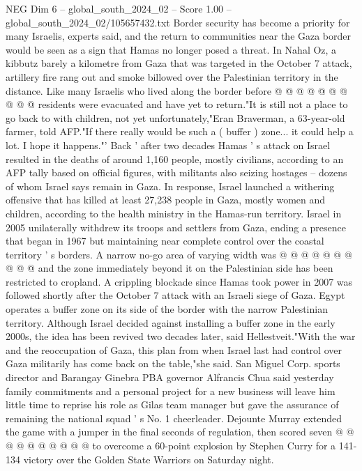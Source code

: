 \begin{textsample}{NEG Dim 6 – global\_south\_2024\_02 – Score 1.00 – global\_south\_2024\_02/105657432.txt}
Border security has become a priority for many Israelis, experts said, and the return to communities near the Gaza border would be seen as a sign that Hamas no longer posed a threat.
In Nahal Oz, a kibbutz barely a kilometre from Gaza that was targeted in the October 7 attack, artillery fire rang out and smoke billowed over the Palestinian territory in the distance.
Like many Israelis who lived along the border before @ @ @ @ @ @ @ @ @ @ residents were evacuated and have yet to return."It is still not a place to go back to with children, not yet unfortunately,"Eran Braverman, a 63-year-old farmer, told AFP."If there really would be such a ( buffer ) zone... it could help a lot.
I hope it happens."' Back ' after two decades Hamas ' s attack on Israel resulted in the deaths of around 1,160 people, mostly civilians, according to an AFP tally based on official figures, with militants also seizing hostages -- dozens of whom Israel says remain in Gaza.
In response, Israel launched a withering offensive that has killed at least 27,238 people in Gaza, mostly women and children, according to the health ministry in the Hamas-run territory.
Israel in 2005 unilaterally withdrew its troops and settlers from Gaza, ending a presence that began in 1967 but maintaining near complete control over the coastal territory ' s borders.
A narrow no-go area of varying width was @ @ @ @ @ @ @ @ @ @ and the zone immediately beyond it on the Palestinian side has been restricted to cropland.
A crippling blockade since Hamas took power in 2007 was followed shortly after the October 7 attack with an Israeli siege of Gaza.
Egypt operates a buffer zone on its side of the border with the narrow Palestinian territory.
Although Israel decided against installing a buffer zone in the early 2000s, the idea has been revived two decades later, said Hellestveit."With the war and the reoccupation of Gaza, this plan from when Israel last had control over Gaza militarily has come back on the table,"she said.
San Miguel Corp. sports director and Barangay Ginebra PBA governor Alfrancis Chua said yesterday family commitments and a personal project for a new business will leave him little time to reprise his role as Gilas team manager but gave the assurance of remaining the national squad ' s No. 1 cheerleader.
Dejounte Murray extended the game with a jumper in the final seconds of regulation, then scored seven @ @ @ @ @ @ @ @ @ @ to overcome a 60-point explosion by Stephen Curry for a 141-134 victory over the Golden State Warriors on Saturday night.

\end{textsample}
